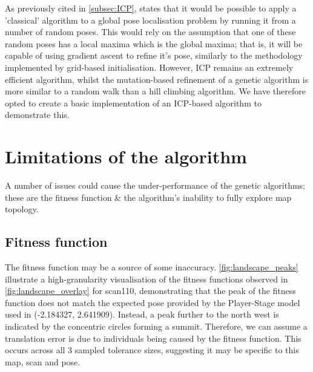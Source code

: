 \documentclass[authoryearcitations]{UoYCSproject}
\begin{document}
As previously cited in \autoref{subsec:ICP}, \citet{Censi2005-iv} states that it would be possible to apply a 'classical' algorithm to a global pose localisation problem by running it from a number of random poses. This would rely on the assumption that one of these random poses has a local maxima which is the global maxima; that is, it will be capable of using gradient ascent to refine it's pose, similarly to the methodology implemented by grid-based initialisation. However, ICP remains an extremely efficient algorithm, whilst the mutation-based refinement of a genetic algorithm is more similar to a random walk than a hill climbing algorithm. We have therefore opted to create a basic implementation of an ICP-based algorithm to demonstrate this.








\section{Limitations of the algorithm}
\label{sec:algorithm_limitations}
A number of issues could cause the under-performance of the genetic algorithms; these are the fitness function \& the algorithm's inability to fully explore map topology.

\subsection{Fitness function}
\label{subsec:criticism_fitness_func}
The fitness function may be a source of some inaccuracy. \autoref{fig:landscape_peaks} illustrate a high-granularity visualisation of the fitness functions observed in \autoref{fig:landscape_overlay} for scan110, demonstrating that the peak of the fitness function does not match the expected pose provided by the Player-Stage model used in \citet{Lenac2011-co}(-2.184327, 2.641909). Instead, a peak further to the north west is indicated by the concentric circles forming a summit. Therefore, we can assume a translation error is due to individuals being caused by the fitness function. This occurs across all 3 sampled tolerance sizes, suggesting it may be specific to this map, scan and pose.
\end{document}
